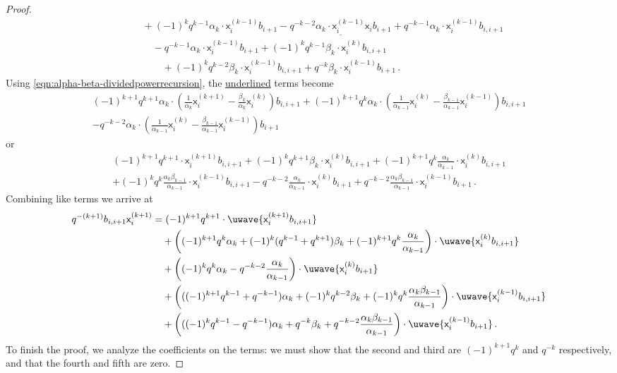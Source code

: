 \documentclass[10pt]{amsart}
\numberwithin{equation}{section}
\theoremstyle{definition}
\newcommand{\xxb}{\mathsf{x}}
\begin{document}
\begin{proof}
\begin{align*}
	&\qquad + (-1)^kq^{k-1}\alpha_k\cdot\xxb_i^{(k-1)}b_{i+1} - \underline{ q^{-k-2}\alpha_k\cdot\xxb_i^{(k-1)}\xxb_{i}b_{i+1} } + q^{-k-1}\alpha_k\cdot\xxb_i^{(k-1)}b_{i,i+1} \\
	&\qquad \quad - q^{-k-1}\alpha_k\cdot\xxb_i^{(k-1)}b_{i+1} + (-1)^kq^{k-1}\beta_k\cdot\xxb_{i}^{(k)}b_{i,i+1} \\
	&\qquad \qquad + (-1)^kq^{k-2}\beta_k\cdot\xxb_i^{(k-1)}b_{i,i+1} + q^{-k}\beta_k\cdot \xxb_i^{(k-1)}b_{i+1} \, .
\end{align*}
Using \eqref{eqn:alpha-beta-dividedpowerrecursion}, the \underline{underlined} terms become
\begin{multline*}
(-1)^{k+1}q^{k+1}\alpha_k\cdot\left(\frac{1}{\alpha_k}\xxb_{i}^{(k+1)} - \frac{\beta_k}{\alpha_k}\xxb_{i}^{(k)}\right)b_{i,i+1}
+(-1)^{k+1}q^{k}\alpha_k\cdot\left(\frac{1}{\alpha_{k-1}}\xxb_{i}^{(k)} - \frac{\beta_{k-1}}{\alpha_{k-1}}\xxb_{i}^{(k-1)}\right)b_{i,i+1} \\
-q^{-k-2}\alpha_k\cdot\left(\frac{1}{\alpha_{k-1}}\xxb_{i}^{(k)} - \frac{\beta_{k-1}}{\alpha_{k-1}}\xxb_{i}^{(k-1)}\right)b_{i+1}
\end{multline*}
or
\begin{multline*}
(-1)^{k+1}q^{k+1}\cdot\xxb_{i}^{(k+1)}b_{i,i+1}  
	+(-1)^{k}q^{k+1}\beta_k\cdot \xxb_{i}^{(k)}b_{i,i+1}
	+(-1)^{k+1}q^{k}\frac{\alpha_k}{\alpha_{k-1}}\cdot\xxb_{i}^{(k)} b_{i,i+1} \\
	+(-1)^{k}q^{k}\frac{\alpha_k\beta_{k-1}}{\alpha_{k-1}}\cdot\xxb_{i}^{(k-1)}b_{i,i+1}
	-q^{-k-2}\frac{\alpha_k}{\alpha_{k-1}}\cdot\xxb_{i}^{(k)}b_{i+1} 
	+q^{-k-2}\frac{\alpha_k\beta_{k-1}}{\alpha_{k-1}}\cdot\xxb_{i}^{(k-1)}b_{i+1} \, .
\end{multline*}
Combining like terms we arrive at
\begin{align*}
q^{-(k+1)}b_{i,i+1}\xxb_{i}^{(k+1)} &= (-1)^{k+1}q^{k+1}\cdot\uwave{\xxb_{i}^{(k+1)}b_{i,i+1}} \\
	&\quad +\left( (-1)^{k+1}q^{k}\alpha_k + (-1)^k (q^{k-1}+q^{k+1})\beta_k 
		+(-1)^{k+1}q^{k}\frac{\alpha_k}{\alpha_{k-1}} \right)\cdot\uwave{ \xxb_{i}^{(k)}b_{i,i+1} } \\
	&\quad + \left((-1)^kq^{k}\alpha_k -q^{-k-2}\frac{\alpha_k}{\alpha_{k-1}}\right)\cdot\uwave{\xxb_{i}^{(k)}b_{i+1}} \\
	&\quad + \left( ((-1)^{k+1}q^{k-1} + q^{-k-1})\alpha_k + (-1)^kq^{k-2}\beta_k
		+(-1)^{k}q^{k}\frac{\alpha_k\beta_{k-1}}{\alpha_{k-1}}\right)\cdot\uwave{\xxb_{i}^{(k-1)}b_{i,i+1}} \\
	&\quad +\left(((-1)^kq^{k-1} - q^{-k-1})\alpha_k + q^{-k}\beta_k
		+q^{-k-2}\frac{\alpha_k\beta_{k-1}}{\alpha_{k-1}}\right)\cdot\uwave{\xxb_{i}^{(k-1)}b_{i+1}} \, .
\end{align*}
To finish the proof, we analyze the coefficients on the  terms:
we must show that the second and third are $(-1)^{k+1}q^{k}$ and $q^{-k}$ respectively, 
and that the fourth and fifth are zero. 


\end{proof}
\end{document}
